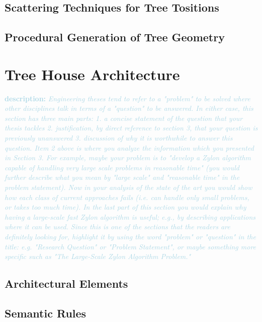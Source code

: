 \documentclass{article}
\newcommand{\desc}[1]{\textcolor{lightblue}{\textbf{\newline description: }\it{#1} \newline}}
\begin{document}
\subsection{Scattering Techniques for Tree Tositions}
\subsection{Procedural Generation of Tree Geometry}

\section{Tree House Architecture}





\desc{
Engineering theses tend to refer to a "problem" to be solved where other disciplines talk in terms of a "question" to be answered. In either case, this section has three main parts:
1. a concise statement of the question that your thesis tackles
2. justification, by direct reference to section 3, that your question is previously unanswered
3. discussion of why it is worthwhile to answer this question.
Item 2 above is where you analyze the information which you presented in Section 3. For example, maybe your problem is to "develop a Zylon algorithm capable of handling very large scale problems in reasonable time" (you would further describe what you mean by "large scale" and "reasonable time" in the problem statement). Now in your analysis of the state of the art you would show how each class of current approaches fails (i.e. can handle only small problems, or takes too much time). In the last part of this section you would explain why having a large-scale fast Zylon algorithm is useful; e.g., by describing applications where it can be used.
Since this is one of the sections that the readers are definitely looking for, highlight it by using the word "problem" or "question" in the title: e.g. "Research Question" or "Problem Statement", or maybe something more specific such as "The Large-Scale Zylon Algorithm Problem." 
}

\subsection{Architectural Elements} 

\subsection{Semantic Rules} 
\end{document}
